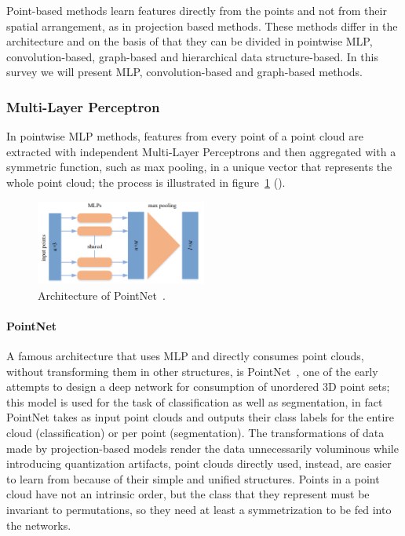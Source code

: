 Point-based methods learn features directly from the points and not from their spatial arrangement, as in projection based methods. These methods differ in the architecture and on the basis of that they can be divided in pointwise MLP, convolution-based, graph-based and hierarchical data structure-based. In this survey we will present MLP, convolution-based and graph-based methods.

\subsubsection{Multi-Layer Perceptron}

In pointwise MLP methods, features from every point of a point cloud are extracted with independent Multi-Layer Perceptrons and then aggregated with a symmetric function, such as max pooling, in a unique vector that represents the whole point cloud; the process is illustrated in figure~\ref{fig:mlp} (\cite{guo2020deep}). 

\begin{figure}[ht]
    \centering
    \includegraphics[width=0.5\textwidth]{images/mlp.png}
    \caption{Architecture of PointNet~\cite{guo2020deep}.}
    \label{fig:mlp}
\end{figure}

\paragraph{PointNet}
\label{par:pointnet}

A famous architecture that uses MLP and directly consumes point clouds, without transforming them in other structures, is PointNet~\cite{qi2017pointnet}, one of the early attempts to design a deep network for consumption of unordered 3D point sets; this model is used for the task of classification as well as segmentation, in fact PointNet takes as input point clouds and outputs their class labels for the entire cloud (classification) or per point (segmentation). The transformations of data made by projection-based models render the data unnecessarily voluminous while introducing quantization artifacts, point clouds directly used, instead, are easier to learn from because of their simple and unified structures. Points in a point cloud have not an intrinsic order, but the class that they represent must be invariant to permutations, so they need at least a symmetrization to be fed into the networks. 

